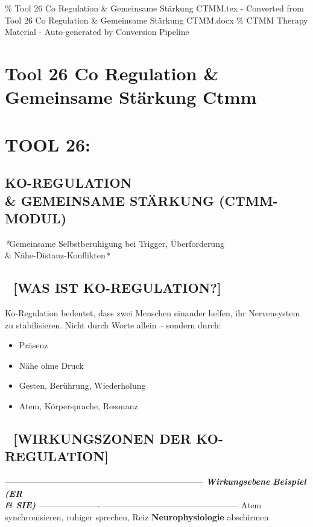 \% Tool 26 Co Regulation \& Gemeinsame Stärkung CTMM.tex - Converted from Tool 26 Co Regulation \& Gemeinsame Stärkung CTMM.docx
\% CTMM Therapy Material - Auto-generated by Conversion Pipeline

\section{Tool 26 Co Regulation \& Gemeinsame Stärkung Ctmm}
\label{sec:tool-26-co-regulation-gemeinsame-st-rkung-ctmm}

\section{\textcolor{ctmmPurple}{} \textbf{TOOL 26:}}
\subsection{\textbf{KO-REGULATION \\& GEMEINSAME STÄRKUNG (\textcolor{ctmmBlue}{CTMM}-MODUL)}}

\textcolor{ctmmBlue}{} \textit{*}Gemeinsame Selbstberuhigung bei \textcolor{ctmmRed}{Trigger}, Überforderung \\&
Nähe-Distanz-Konflikten\textit{*}

\subsection{🤝 \textbf{[WAS IST KO-REGULATION?]}}

Ko-Regulation bedeutet, dass zwei Menschen einander helfen, ihr
Nervensystem zu stabilisieren. Nicht durch Worte allein -- sondern
durch:

\begin{itemize}
\item   Präsenz
\item   Nähe ohne Druck
\item   Gesten, Berührung, Wiederholung
\item   Atem, Körpersprache, Resonanz
\end{itemize}

\subsection{💞 \textbf{[WIRKUNGSZONEN DER KO-REGULATION]}}

-----------------------------------------------------------------------
\textbf{\textit{Wirkungsebene}}    \textbf{\textit{Beispiel (ER \\& SIE)}}
---------------------- ------------------------------------------------
\textcolor{ctmmPurple}{}                     Atem synchronisieren, ruhiger sprechen, Reiz
\textbf{Neurophysiologie}   abschirmen

